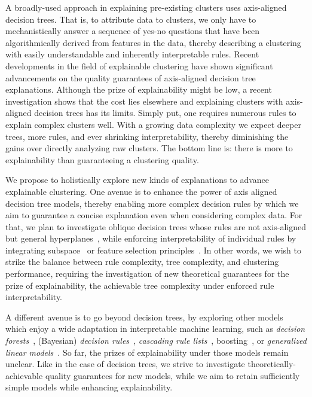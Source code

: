 \documentclass[a4paper,11pt]{article}
\begin{document}
A broadly-used approach in explaining pre-existing clusters uses axis-aligned decision trees. 
That is, to attribute data to clusters, we only have to mechanistically answer a sequence of yes-no questions that have been algorithmically derived from features in the data, thereby describing a clustering with easily understandable and inherently interpretable rules.
Recent developments in the field of explainable clustering have shown significant advancements on the quality guarantees of axis-aligned decision tree explanations. 
Although the prize of explainability might be low, a recent investigation shows that the cost lies elsewhere and explaining clusters with axis-aligned decision trees has its limits.
Simply put, one requires numerous rules to explain complex clusters well.
With a growing data complexity we expect deeper trees, more rules, and ever shrinking interpretability, thereby diminishing the  
gains over directly analyzing raw clusters.  
The bottom line is: there is more to explainability than guaranteeing a clustering quality.

We propose to holistically explore new kinds of explanations to advance explainable clustering.
One avenue is to enhance the power of axis aligned decision tree models, thereby enabling more complex decision rules by which we aim to guarantee a concise explanation even when considering complex data.
For that, we plan to investigate oblique decision trees whose rules are not axis-aligned but general hyperplanes~\cite{}, while enforcing interpretability of individual rules by integrating subspace~\cite{} or feature selection principles~\cite{}. 
In other words, we wish to strike the balance between rule complexity, tree complexity, and clustering performance,
requiring the investigation of new theoretical guarantees for the prize of explainability, the achievable tree complexity under enforced rule interpretability.

A different avenue is to go beyond decision trees, by exploring other models which enjoy a wide adaptation in interpretable machine learning, such as \emph{decision forests}~\cite{}, (Bayesian) \emph{decision rules}~\cite{}, \emph{cascading rule lists}~\cite{}, boosting~\cite{}, or \emph{generalized linear models}~\cite{}.
So far, the prizes of explainability under those models remain unclear. 
Like in the case of decision trees, we strive to investigate theoretically-achievable quality guarantees for new models, while we aim to retain sufficiently simple models while enhancing explainability.
\end{document}
